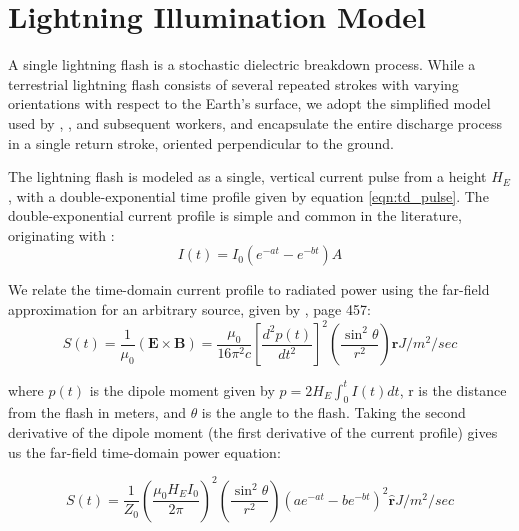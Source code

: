 \section{Lightning Illumination Model}
\label{section:input_power}
A single lightning flash is a stochastic dielectric breakdown process. While a terrestrial lightning flash consists of several repeated strokes with varying orientations with respect to the Earth's surface, we adopt the simplified model used by \cite{Lauben1998}, \cite{Bortnik2005}, and subsequent workers, and encapsulate the entire discharge process in a single return stroke, oriented perpendicular to the ground.

The lightning flash is modeled as a single, vertical current pulse from a height $H_E$, with a double-exponential time profile given by equation \eqref{eqn:td_pulse}. The double-exponential current profile is simple and common in the literature, originating with \cite{Bruce_Golde_1941}:
\begin{equation}
\label{eqn:td_pulse}
I(t)=I_0(e^{-a t} - e^{-b t}) \unit{A}
\end{equation}

We relate the time-domain current profile to radiated power using the far-field approximation for an arbitrary source, given by \cite{Griffiths1999}, page 457:
\begin{equation}
\label{eqn:griffiths_power}
S(t) =
 \frac{1}{\mu_0}(\mathbf{E} \times \mathbf{B}) = \frac{\mu_0}{16\pi^2c}\left[\frac{d^2p(t)}{dt^2}\right]^2 \left(\frac{\sin^2\theta}{r^2}\right)\mathbf{\hat{r}} \unit{J/m^2/sec}
\end{equation}

where $p(t)$ is the dipole moment given by $p=2 H_E \int_0^t{I(t)}dt$, r is the distance from the flash in meters, and $\theta$ is the angle to the flash. Taking the second derivative of the dipole moment (the first derivative of the current profile) gives us the far-field time-domain power equation:

\begin{equation}
\label{eqn:farfield_power_td}
S(t) = \frac{1}{Z_0}\left(\frac{\mu_0 H_E I_0}{2 \pi}\right)^2\left(\frac{\sin^2\theta}{r^2}\right) \left(a e^{-a t} - b e^{-b t}\right)^2  \mathbf{\hat{r}}
\unit{J/m^2/sec}
\end{equation}

